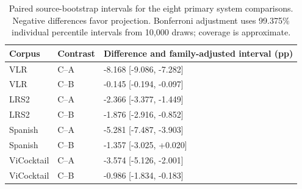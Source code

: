 \begin{table}[tb]
\centering\small
\caption{Paired source-bootstrap intervals for the eight primary system comparisons. Negative differences favor projection. Bonferroni adjustment uses 99.375\% individual percentile intervals from 10,000 draws; coverage is approximate.}
\label{tab:primary-intervals}
\begin{tabular}{lll}
\toprule
Corpus & Contrast & Difference and family-adjusted interval (pp) \\
\midrule
VLR & C--A & -8.168 [-9.086, -7.282] \\
VLR & C--B & -0.145 [-0.194, -0.097] \\
LRS2 & C--A & -2.366 [-3.377, -1.449] \\
LRS2 & C--B & -1.876 [-2.916, -0.852] \\
Spanish & C--A & -5.281 [-7.487, -3.903] \\
Spanish & C--B & -1.357 [-3.025, +0.020] \\
ViCocktail & C--A & -3.574 [-5.126, -2.001] \\
ViCocktail & C--B & -0.986 [-1.834, -0.183] \\
\bottomrule
\end{tabular}
\end{table}
